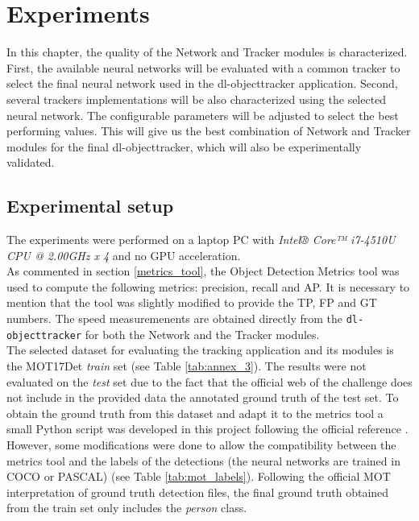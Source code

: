 \chapter{Experiments}
In this chapter, the quality of the Network and Tracker modules is characterized. First, the available neural networks will be evaluated with a common tracker to select the final neural network used in the dl-objecttracker application. Second, several trackers implementations will be also characterized using the selected neural network. The configurable parameters will be adjusted to select the best performing values. This will give us the best combination of Network and Tracker modules for the final dl-objecttracker, which will also be experimentally validated.\\
\section{Experimental setup}
The experiments were performed on a laptop PC with \textit{Intel® Core™ i7-4510U CPU @ 2.00GHz x 4} and no GPU acceleration.\\ As commented in section \ref{metrics_tool}, the Object Detection Metrics tool was used to compute the following metrics: precision, recall and AP. It is necessary to mention that the tool was slightly modified to provide the TP, FP and GT numbers. The speed measuremenents are obtained directly from the \texttt{dl-objecttracker} for both the Network and the Tracker modules.\\
The selected dataset for evaluating the tracking application and its modules is the MOT17Det \cite{milan2016mot16} \textit{train} set (see Table \ref{tab:annex_3}). The results were not evaluated on the \textit{test} set due to the fact that the official web of the challenge does not include in the provided data the annotated ground truth of the test set. To obtain the ground truth from this dataset and adapt it to the metrics tool a small Python script was developed in this project following the official reference \cite{milan2016mot16}. However, some modifications were done to allow the compatibility between the metrics tool and the labels of the detections (the neural networks are trained in COCO or PASCAL) (see Table \ref{tab:mot_labels}). Following the official MOT interpretation of ground truth detection files, the final ground truth obtained from the train set only includes the \textit{person} class.
